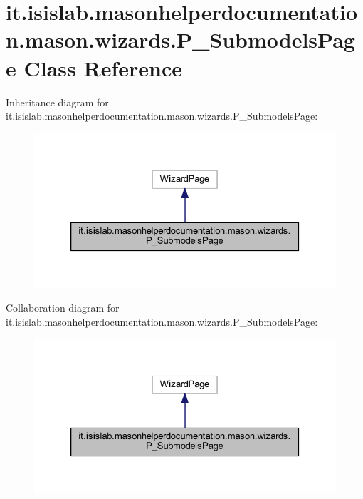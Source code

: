 \hypertarget{classit_1_1isislab_1_1masonhelperdocumentation_1_1mason_1_1wizards_1_1_p___submodels_page}{\section{it.\-isislab.\-masonhelperdocumentation.\-mason.\-wizards.\-P\-\_\-\-Submodels\-Page Class Reference}
\label{classit_1_1isislab_1_1masonhelperdocumentation_1_1mason_1_1wizards_1_1_p___submodels_page}
}


Inheritance diagram for it.\-isislab.\-masonhelperdocumentation.\-mason.\-wizards.\-P\-\_\-\-Submodels\-Page\-:\nopagebreak
\begin{figure}[H]
\begin{center}
\leavevmode
\includegraphics[width=326pt]{classit_1_1isislab_1_1masonhelperdocumentation_1_1mason_1_1wizards_1_1_p___submodels_page__inherit__graph}
\end{center}
\end{figure}


Collaboration diagram for it.\-isislab.\-masonhelperdocumentation.\-mason.\-wizards.\-P\-\_\-\-Submodels\-Page\-:\nopagebreak
\begin{figure}[H]
\begin{center}
\leavevmode
\includegraphics[width=326pt]{classit_1_1isislab_1_1masonhelperdocumentation_1_1mason_1_1wizards_1_1_p___submodels_page__coll__graph}
\end{center}
\end{figure}

